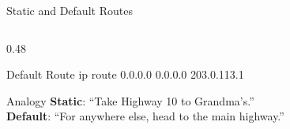 \documentclass[aspectratio=169]{beamer}  %
\begin{document}
\begin{frame}{Static and Default Routes}
\begin{columns}[T]
\begin{column}{0.48\textwidth}
\begin{block}{Default Route}
                \vspace{0.2em}
                \ttfamily\footnotesize
                ip route 0.0.0.0 0.0.0.0 203.0.113.1
            \end{block}
            
            \vspace{0.2em}
            \begin{exampleblock}{Analogy}
                \small
                \textbf{Static}: ``Take Highway 10 to Grandma's.'' \\
                \textbf{Default}: ``For anywhere else, head to the main highway.''
            \end{exampleblock}
        \end{column}
    \end{columns}
\end{frame}
\end{document}
